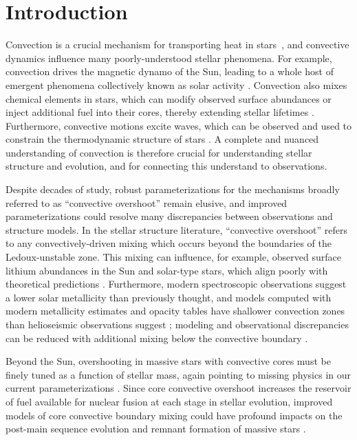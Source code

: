 \documentclass[twocolumn]{aastex631}
\begin{document}
\section{Introduction}
\label{sec:introduction}
Convection is a crucial mechanism for transporting heat in stars~\citep{woosley_etal_2002, hansen_etal_2004, christensen-dalsgaard_2021}, and convective dynamics influence many poorly-understood stellar phenomena.
For example, convection drives the magnetic dynamo of the Sun, leading to a whole host of emergent phenomena collectively known as solar activity \citep{brun_browning_2017}.
Convection also mixes chemical elements in stars, which can modify observed surface abundances or inject additional fuel into their cores, thereby extending stellar lifetimes \citep{salaris_cassisi_2017}.
Furthermore, convective motions excite waves, which can be observed and used to constrain the thermodynamic structure of stars \citep{aerts2010, basu2016}.
A complete and nuanced understanding of convection is therefore crucial for understanding stellar structure and evolution, and for connecting this understand to observations.

Despite decades of study, robust parameterizations for the mechanisms broadly referred to as ``convective overshoot'' remain elusive, and improved parameterizations could resolve many discrepancies between observations and structure models.
In the stellar structure literature, ``convective overshoot'' refers to any convectively-driven mixing which occurs beyond the boundaries of the Ledoux-unstable zone.
This mixing can influence, for example, observed surface lithium abundances in the Sun and solar-type stars, which align poorly with theoretical predictions \citep{pinsonneault1997, carlos_etal_2019, dumont_etal_2021}.
Furthermore, modern spectroscopic observations suggest a lower solar metallicity than previously thought, and models computed with modern metallicity estimates and opacity tables have shallower convection zones than helioseismic observations suggest \citep{basu_antia_2004, bahcall_etal_2005, bergemann_serenelli_2014, vinyoles_etal_2017, asplund_etal_2021}; modeling and observational discrepancies can be reduced with additional mixing below the convective boundary \citep{christensen-dalsgaard_etal_2011}.

Beyond the Sun, overshooting in massive stars with convective cores must be finely tuned as a function of stellar mass, again pointing to missing physics in our current parameterizations \citep{claret_torres_2018, jermyn_etal_2018, viani_basu_2020, martinet_etal_2021, pedersen_etal_2021}.
Since core convective overshoot increases the reservoir of fuel available for nuclear fusion at each stage in stellar evolution, improved models of core convective boundary mixing could have profound impacts on the post-main sequence evolution and remnant formation of massive stars \citep{farmer_etal_2019, higgins_vink_2020}.
\end{document}

